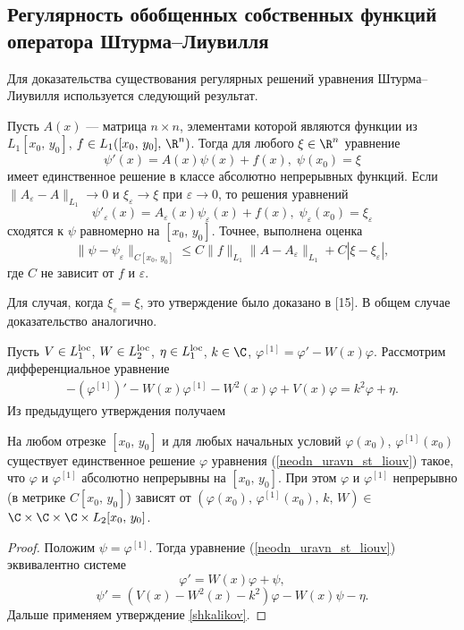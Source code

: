 \documentclass[a4paper
]{article}
\begin{document}
\subsection{Регулярность обобщенных собственных функций\\ оператора
Штурма--Лиувилля} \label{regul_par} Для доказательства
существования регулярных решений уравнения Штурма--Лиувилля
используется следующий результат.
\begin{Sta}
\label{shkalikov}
Пусть $A(x)$ --- матрица $n\times n$, элементами которой являются
функции из $L_1[x_0, \, y_0]$, $f\in L_1([x_0, \, y_0], \, \R^n)$. Тогда
для любого $\xi\in \R^n$ уравнение $$\psi'(x)=A(x)\psi(x)+f(x), \;
\psi(x_0)=\xi$$ имеет единственное решение в классе абсолютно непрерывных
функций. Если $\|A_\varepsilon-A\|_{L_1}\rightarrow 0$ и $\xi_\varepsilon
\rightarrow \xi$ при $\varepsilon\rightarrow 0$, то решения уравнений
$$\psi'_\varepsilon(x)=A_\varepsilon(x)\psi_\varepsilon(x)+f(x), \;
\psi_\varepsilon(x_0)=\xi_\varepsilon$$ сходятся к $\psi$ равномерно
на $[x_0, \, y_0]$. Точнее, выполнена оценка
$$\|\psi-\psi_\varepsilon\|_{C[x_0, \, y_0]}\le C\|f\|_{L_1}\|A-
A_\varepsilon\|_{L_1}+C|\xi-\xi_\varepsilon|,$$ где $C$ не зависит от
$f$ и $\varepsilon$.
\end{Sta}
Для случая, когда $\xi_\varepsilon=\xi$, это утверждение было доказано в
[15]. В общем случае доказательство аналогично. \par
Пусть $V\in L_1^{{\rm loc}}$, $W\in L_2^{{\rm loc}}$, $\eta \in L_1^{{\rm
loc}}$, $k\in \C$, $\varphi^{[1]}=\varphi'-W(x)\varphi$. Рассмотрим
дифференциальное уравнение
\begin{align}
\label{neodn_uravn_st_liouv}
-(\varphi^{[1]})'-W(x)\varphi^{[1]}-W^2(x)\varphi+V(x)\varphi=k^2\varphi
+\eta.
\end{align}
Из предыдущего утверждения получаем
\begin{Cor}
\label{exist_uniq}
На любом отрезке $[x_0, \, y_0]$ и для любых начальных условий $\varphi(x_0)$,
$\varphi^{[1]}(x_0)$ существует единственное решение $\varphi$ уравнения
(\ref{neodn_uravn_st_liouv}) такое, что $\varphi$ и $\varphi^{[1]}$
абсолютно непрерывны на $[x_0, \, y_0]$. При этом $\varphi$ и
$\varphi^{[1]}$ непрерывно (в метрике $C[x_0, \, y_0]$) зависят от
$(\varphi(x_0), \, \varphi^{[1]}(x_0), \, k, \, W)\in $ $\C\times\C\times
\C\times L_2[x_0, \, y_0]$.
\end{Cor}
\begin{proof}
Положим $\psi=\varphi^{[1]}$. Тогда уравнение (\ref{neodn_uravn_st_liouv})
эквивалентно системе $$\varphi'=W(x)\varphi+\psi,$$ $$\psi'=(V(x)-
W^2(x)-k^2)\varphi-W(x)\psi-\eta.$$
Дальше применяем утверждение \ref{shkalikov}.
\end{proof}
\end{document}
